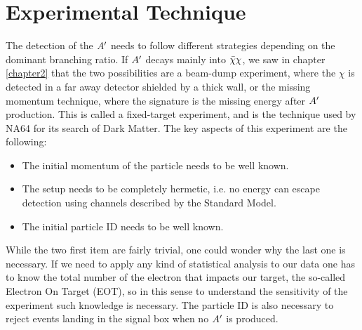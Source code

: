 \section{Experimental Technique}
\label{ch2:sec:experimental-technique}

The detection of the $A'$ needs to follow different strategies depending on the dominant branching ratio. If $A'$ decays mainly into $\bar{\chi} \chi$, we saw in chapter \ref{chapter2} that the two possibilities are a beam-dump experiment, where the $\chi$ is detected in a far away detector shielded by a thick wall, or the missing momentum technique, where the signature is the missing energy after $A'$ production. This is called a fixed-target experiment, and is the technique used by NA64 for its search of Dark Matter. The key aspects of this experiment are the following:

\begin{itemize}
\item The initial momentum of the particle needs to be well known.
\item The setup needs to be completely hermetic, i.e. no energy can escape detection using channels described by the Standard Model.
\item The initial particle ID needs to be well known.
\end{itemize}

While the two first item are fairly trivial, one could wonder why the last one is necessary. If we need to apply any kind of statistical analysis to our data one has to know the total number of the electron that impacts our target, the so-called Electron On Target (EOT), so in this sense to understand the sensitivity of the experiment such knowledge is necessary. The particle ID is also necessary to reject events landing in the signal box when no $A'$ is produced.

